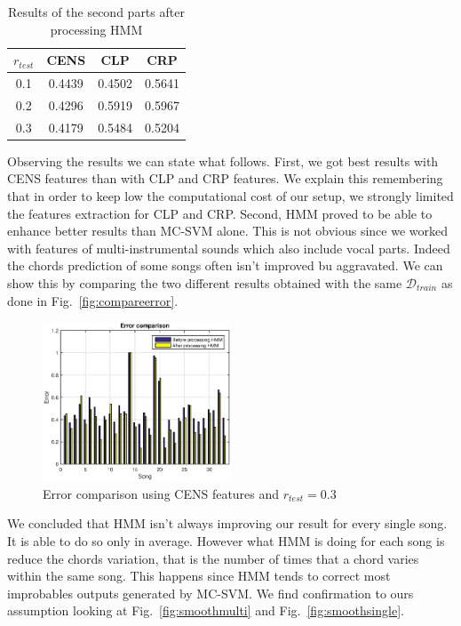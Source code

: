 \begin{table}[h!]
	\caption{Results of the second parts after processing HMM}
	\centering
	\begin{tabular}{|c |c c c|}
	\hline
	$r_{test}$ & CENS & CLP & CRP\\ \hline
	0.1 & 0.4439 & 0.4502 & 0.5641\\
	0.2 & 0.4296 & 0.5919 & 0.5967\\
	0.3 & 0.4179 & 0.5484 & 0.5204\\
	\hline
	\end{tabular}
	\label{tab:resultafterHMM}
\end{table}

 Observing the results we can state what follows. First, we got best results with CENS features than with CLP and CRP features. We explain this remembering that in order to keep low the computational cost of our setup, we strongly limited the features extraction for CLP and CRP. Second, HMM proved to be able to enhance better results than MC-SVM alone. This is not obvious since we worked with features of multi-instrumental sounds which also include vocal parts. Indeed the chords prediction of some songs often isn't improved bu aggravated. We can show this by comparing the two different results obtained with the same $\mathcal{D}_{train}$ as done in Fig.~\ref{fig:compareerror}.

\begin{figure} [h!]
	\includegraphics[width=0.5\textwidth]{img/Result_HMM/CENS/plot03071}
	\caption{Error comparison using CENS features and $r_{test}=0.3$}
	\label{fig:copareerror}
\end{figure}

We concluded that HMM isn't always improving our result for every single song. It is able to do so only in average. However what HMM is doing for each song is reduce the chords variation, that is the number of times that a chord varies within the same song. This happens since HMM tends to correct most improbables outputs generated by MC-SVM. We find confirmation to ours assumption looking at
Fig.~\ref{fig:smoothmulti} and Fig.~\ref{fig:smoothsingle}.

